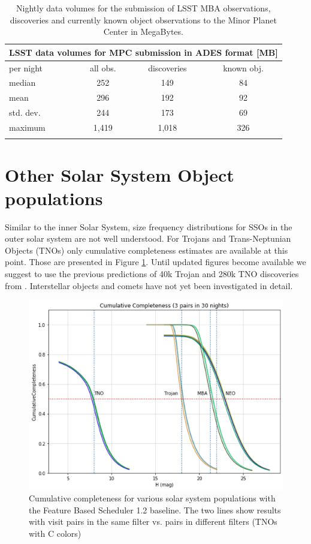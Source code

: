 \begin{table}[tb!]
\begin{center}
\begin{tabular}{lccc}
\multicolumn{4}{c}{LSST data volumes for \gls{MPC} submission in \gls{ADES} format [MB]}\\
\hline\hline
per night & all obs. & discoveries & known obj. \\\hline
median  & 252 &149  &84  \\
mean & 296 & 192 & 92   \\
std. dev. & 244 & 173& 69 \\
maximum & 1,419 & 1,018 & 326 \\
\hline\hline\\
\end{tabular}
\end{center}
\caption{Nightly data volumes for the submission of \gls{LSST} \gls{MBA} observations, discoveries and currently known object observations to the Minor Planet \gls{Center} in MegaBytes.}
\label{tab:data_stats}
\end{table}

\section{Other Solar System \gls{Object} populations}\label{sec:other}
Similar to the inner Solar System, size frequency distributions for SSOs in the outer solar system are not well understood. 
For Trojans and Trans-Neptunian Objects (TNOs) only cumulative completeness estimates are available at this point. Those are presented in Figure \ref{fig:allcum}.
Until updated figures become available we suggest to use the previous predictions of 40k Trojan and 280k \gls{TNO} discoveries from \citet{jones2015asteroid}.
Interstellar objects and comets have not yet been investigated in detail.

\begin{figure}[tb!]
\begin{center}
\includegraphics[width=0.60\linewidth]{figs/allcum.png}
\end{center}
\caption{Cumulative completeness for various solar system populations with the Feature Based Scheduler 1.2 baseline.
The two lines show results with visit pairs in the same filter vs. pairs in different filters (TNOs with C colors)}
\label{fig:allcum}       %
\end{figure}


